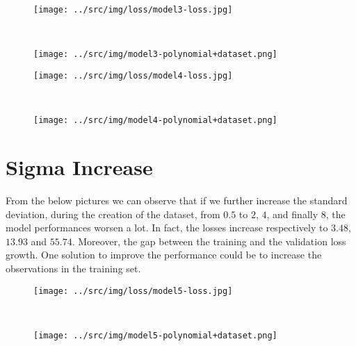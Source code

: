 \documentclass[a4paper,12pt]{article} %
\begin{document}
	\begin{figure}[H]
		\begin{minipage}[t]{.5\textwidth}
			\centering
			\texttt{[image: ../src/img/loss/model3-loss.jpg]}
			\label{fig:model3-loss}
		\end{minipage}
		~
		\begin{minipage}[t]{.5\textwidth}
			\centering
			\texttt{[image: ../src/img/model3-polynomial+dataset.png]}
			\label{fig:model3-polynomial+dataset}
		\end{minipage}
	\end{figure}
	
	\begin{figure}[H]
		\begin{minipage}[t]{.5\textwidth}
			\centering
			\texttt{[image: ../src/img/loss/model4-loss.jpg]}
			\label{fig:model4-loss}
		\end{minipage}
		~
		\begin{minipage}[t]{.5\textwidth}
			\centering
			\texttt{[image: ../src/img/model4-polynomial+dataset.png]}
			\label{fig:model4-polynomial+dataset}
		\end{minipage}
	\end{figure}
	
	\section{Sigma Increase}
	From the below pictures we can observe that if we further increase the  
	standard deviation, during the creation of the dataset, from $0.5$ to $2$, 
	$4$, and finally $8$, the model performances worsen a lot. In fact, the 
	losses increase respectively to $3.48$, $13.93$ and $55.74$. Moreover, the 
	gap between the training and the validation loss growth.
	One solution to improve the performance could be to increase the 
	observations in the training set.
	
	\begin{figure}[H]
		\begin{minipage}[t]{.5\textwidth}
			\centering
			\texttt{[image: ../src/img/loss/model5-loss.jpg]}
			\label{fig:model5-loss}
		\end{minipage}
		~
		\begin{minipage}[t]{.5\textwidth}
			\centering
			\texttt{[image: ../src/img/model5-polynomial+dataset.png]}
			\label{fig:model5-polynomial+dataset}
		\end{minipage}
	\end{figure}
	
\end{document}
